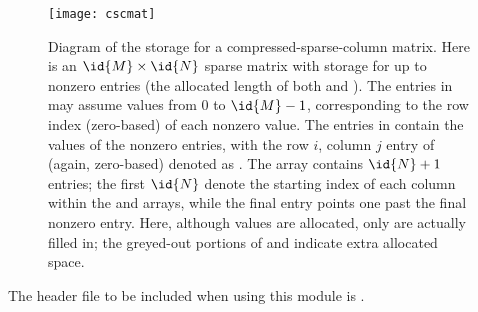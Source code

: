 \begin{figure}
\centerline{\texttt{[image: cscmat]}}
\caption[Diagram of the storage for a compressed-sparse-column matrix] 
  {Diagram of the storage for a compressed-sparse-column
  matrix. Here  is an $\id{M} \times \id{N}$ sparse matrix with storage
  for up to  nonzero entries (the allocated length of
  both  and ).  The entries in 
  may assume values from $0$ to $\id{M}-1$, corresponding to the row index
  (zero-based) of each nonzero value.  The entries in  contain
  the values of the nonzero entries, with the row $i$, column $j$
  entry of  (again, zero-based) denoted as .
  The  array contains $\id{N}+1$ entries; the first $\id{N}$
  denote the starting index of each column within the 
  and  arrays, while the final entry points one past the
  final nonzero entry.  Here, although  values are allocated,
  only  are actually filled in; the greyed-out portions
  of  and  indicate extra allocated
  space.}\label{f:sparsemat} 
\end{figure}

\noindent The header file to be included when using this module 
is . \\

